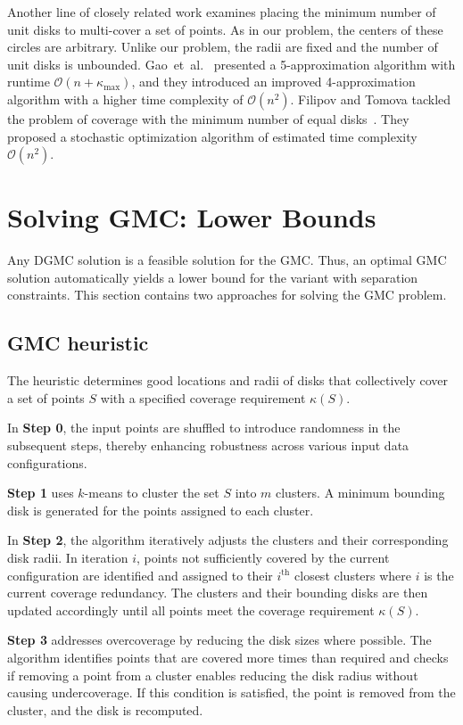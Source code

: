 \documentclass[letterpaper, 10 pt, conference]{ieeeconf}
\newcommand{\bigO}{\mathcal{O}} %
\newcommand{\iteralg}{GMC heuristic}
\begin{document}
Another line of closely related work examines placing the minimum number of unit disks to multi-cover a set of points.
As in our problem, the centers of these circles are arbitrary.
Unlike our problem, the radii are fixed and the number of unit disks is unbounded.
Gao~et~al.~\cite{gao2022fast} presented a 5-approximation algorithm with runtime $\bigO(n + \kappa_\text{max})$, and they introduced an improved 4-approximation algorithm with a higher time complexity of $\bigO(n^2)$. 
Filipov and Tomova tackled the problem of coverage with the minimum number of equal disks~\cite{Georgiev2023}.
They proposed a stochastic optimization algorithm of estimated time complexity $\bigO(n^2)$.


\section{Solving GMC: Lower Bounds}\label{sec:LB}

Any DGMC solution is a feasible solution for the GMC.
Thus, an optimal GMC solution automatically yields a lower bound for the variant with separation constraints.
This section contains two approaches for solving the GMC problem.

\subsection{\iteralg{}}\label{sec:approximation}

The heuristic determines good locations and radii of disks that collectively cover a set of points \( S \) with a specified coverage requirement \( \kappa (S)\).

In \textbf{Step 0}, the input points are shuffled to introduce randomness in the subsequent steps, thereby enhancing robustness across various input data configurations.

\textbf{Step 1}   uses $k$-means to cluster the set \( S \) into \( m \) clusters.  A minimum bounding disk is generated for the points assigned to each cluster.

In \textbf{Step 2}, the algorithm iteratively adjusts the clusters and their corresponding disk radii.
In iteration $i$, points not sufficiently covered by the current configuration are identified and assigned to their $i^\textrm{th}$ closest clusters where $i$ is the current coverage redundancy.
The clusters and their bounding disks are then updated accordingly until all points meet the coverage requirement \( \kappa(S) \).

\textbf{Step 3} addresses overcoverage by reducing the disk sizes where possible.
The algorithm identifies points that are covered more times than required and checks if removing a point from a cluster enables reducing the disk radius without causing undercoverage.
If this condition is satisfied, the point is removed from the cluster, and the disk is recomputed.
\end{document}

